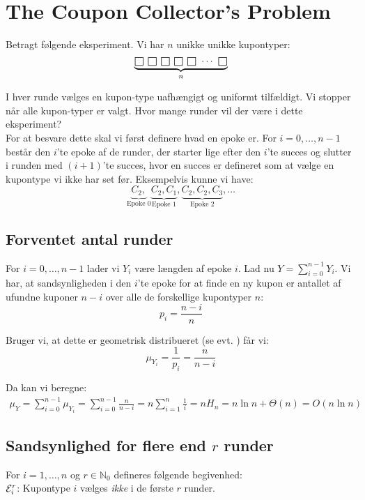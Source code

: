 \section{The Coupon Collector's Problem}
Betragt følgende eksperiment. Vi har $n$ unikke unikke kupontyper:
$$
\underbrace{\msquare \ \msquare \ \msquare \ \msquare \ \msquare \ \cdots \ \msquare}_{n}
$$

I hver runde vælges en kupon-type uafhængigt og uniformt tilfældigt. Vi stopper når alle kupon-typer er valgt. Hvor mange runder vil der være i dette eksperiment?\\

For at besvare dette skal vi først definere hvad en epoke er. For $i = 0, \dots, n-1$ består den $i$'te epoke af de runder, der starter lige efter den $i$'te succes og slutter i runden med $(i+1)$'te succes, hvor en succes er defineret som at vælge en kupontype vi ikke har set før. Eksempelvis kunne vi have:
$$
\underbrace{C_2,}_{\text{Epoke 0}} \underbrace{C_2, C_1}_{\text{Epoke 1}}, \underbrace{C_2, C_2, C_3}_{\text{Epoke 2}}, \dots
$$


\subsection{Forventet antal runder}
For $i = 0, \dots, n-1$ lader vi $Y_i$ være længden af epoke $i$. Lad nu $Y = \sum_{i=0}^{n-1} Y_{i}$. Vi har, at sandsynligheden i den $i$'te epoke for at finde en ny kupon er antallet af ufundne kuponer $n-i$ over alle de forskellige kupontyper $n$:
$$
p_i = \frac{n-i}{n}
$$

Bruger vi, at dette er geometrisk distribueret (se evt. ) får vi:
$$
\mu_{Y_i} = \frac{1}{p_i} = \frac{n}{n-i}
$$

Da kan vi beregne:
\begin{align*}
  \mu_Y
  = \sum_{i=0}^{n-1} \mu_{Y_i}
  = \sum_{i=0}^{n-1} \frac{n}{n-i}
  = n \sum_{i=1}^n \frac{1}{i}
  = n H_n
  = n \ln n + \Theta(n)
  = O(n \ln n)
\end{align*}


\subsection{Sandsynlighed for flere end $r$ runder}
For $i = 1, \dots, n$ og $r \in \mathbb{N}_0$ defineres følgende begivenhed:\\
${\mathcal{E}}_i^r$: Kupontype $i$ vælges \emph{ikke} i de første $r$ runder.\\

